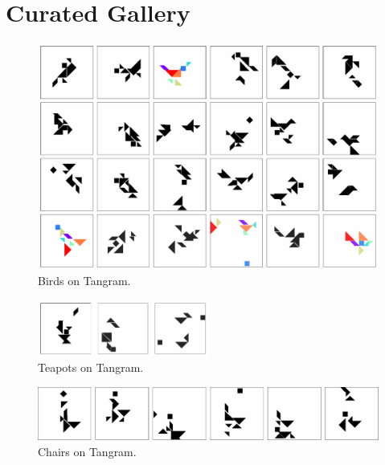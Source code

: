 \chapter{Curated Gallery}
\label{sec:gallery}

\begin{figure}[H]
    \centering
    \includegraphics[width=\textwidth]{images/curation_bird.pdf}
    \caption{Birds on Tangram.}
    \label{fig:curation_bird}
\end{figure}

\begin{figure}[H]
    \centering
    \includegraphics[width=0.5\textwidth]{images/curation_teapot_all.pdf}
    \caption{Teapots on Tangram.}
    \label{fig:curation_teapot}
\end{figure}

\begin{figure}[H]
    \centering
    \includegraphics[width=\textwidth]{images/curation_chair_cropped.pdf}
    \caption{Chairs on Tangram.}
    \label{fig:curation_chair}
\end{figure}

